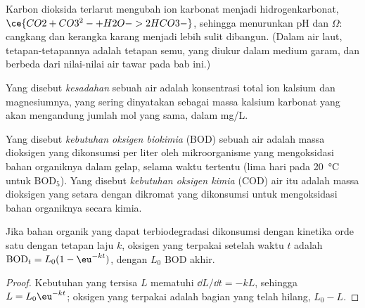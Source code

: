 Karbon dioksida terlarut mengubah ion karbonat menjadi hidrogenkarbonat, $\ce{CO2 + CO3^2- + H2O -> 2HCO3-}$,
sehingga menurunkan pH dan $\Omega$: cangkang dan kerangka karang menjadi lebih sulit dibangun. (Dalam
air laut, tetapan-tetapannya adalah tetapan semu, yang diukur dalam medium garam, dan
berbeda dari nilai-nilai air tawar pada bab ini.)

\begin{definition}\label{def:b3:environmental-toxicology:hardness}
Yang disebut \emph{kesadahan} sebuah air adalah konsentrasi total
ion kalsium dan magnesiumnya, yang sering dinyatakan sebagai massa kalsium karbonat
yang akan mengandung jumlah mol yang sama, dalam mg/L.
\end{definition}

\begin{definition}\label{def:b3:environmental-toxicology:oxygen-demand}
Yang disebut \emph{kebutuhan oksigen biokimia} (BOD) sebuah
air adalah massa dioksigen yang dikonsumsi per liter oleh mikroorganisme yang mengoksidasi
bahan organiknya dalam gelap, selama waktu tertentu (lima hari pada \qty{20}{\celsius} untuk $\mathrm{BOD_5}$). Yang disebut
\emph{kebutuhan oksigen kimia} (COD) air itu adalah massa
dioksigen yang setara dengan dikromat yang dikonsumsi untuk mengoksidasi bahan organiknya
secara kimia.
\end{definition}

\begin{proposition}\label{prop:b3:environmental-toxicology:bod}
Jika bahan organik yang dapat terbiodegradasi dikonsumsi dengan kinetika orde satu dengan tetapan
laju $k$, oksigen yang terpakai setelah waktu $t$ adalah $\mathrm{BOD}_t = L_0(1 - \eu^{-kt})$, dengan $L_0$ BOD akhir.
\end{proposition}

\begin{proof}
Kebutuhan yang tersisa $L$ mematuhi $\dd L/\dd t = -kL$, sehingga $L = L_0\eu^{-kt}$; oksigen yang terpakai adalah bagian yang telah hilang,
$L_0 - L$.
\end{proof}

